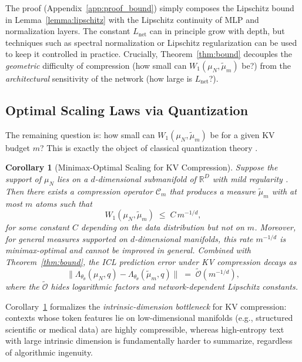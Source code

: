 \documentclass{article}
\theoremstyle{plain}
\newtheorem{corollary}[theorem]{Corollary}
\theoremstyle{definition}
\theoremstyle{remark}
\newcommand{\R}{\mathbb{R}}
\newcommand{\muN}{\mu_N} %
\newcommand{\tmu}{\tilde{\mu}} %
\newcommand{\Wass}[1]{W_{#1}} %
\newcommand{\LambdaOp}{\Lambda_{\theta}} %
\newcommand{\Compress}{\mathcal{C}_m} %
\begin{document}
The proof (Appendix~\ref{app:proof_bound}) simply composes the Lipschitz bound in Lemma~\ref{lemma:lipschitz} with the Lipschitz continuity of MLP and normalization layers.  
The constant $L_{\text{net}}$ can in principle grow with depth, but techniques such as spectral normalization or Lipschitz regularization  
\citep[e.g.,][]{chizat2018global,castin2024how} can be used to keep it controlled in practice.  
Crucially, Theorem~\ref{thm:bound} decouples the \emph{geometric} difficulty of compression (how small can $\Wass{1}(\muN,\tmu_m)$ be?)  
from the \emph{architectural} sensitivity of the network (how large is $L_{\text{net}}$?).

\subsection{Optimal Scaling Laws via Quantization}
\label{sec:theory_scaling}

The remaining question is: how small can $\Wass{1}(\muN,\tmu_m)$ be for a given KV budget $m$?  
This is exactly the object of classical quantization theory \citep{graf2000foundations,villani2009optimal}.

\begin{corollary}[Minimax-Optimal Scaling for KV Compression]
\label{cor:scaling}
Suppose the support of $\muN$ lies on a $d$-dimensional submanifold of $\R^D$ with mild regularity \citep{graf2000foundations}.  
Then there exists a compression operator $\Compress$ that produces a measure $\tmu_m$ with at most $m$ atoms such that
\begin{equation}
    \Wass{1}(\muN,\tmu_m)
    \;\le\;
    C \, m^{-1/d},
\end{equation}
for some constant $C$ depending on the data distribution but not on $m$.  
Moreover, for general measures supported on $d$-dimensional manifolds, this rate $m^{-1/d}$ is minimax-optimal and cannot be improved in general.  
Combined with Theorem~\ref{thm:bound}, the ICL prediction error under KV compression decays as
\begin{equation}
    \big\|
        \LambdaOp_\theta(\muN, q)
        -
        \LambdaOp_\theta(\tmu_m, q)
    \big\|
    \;=\;
    \tilde{\mathcal{O}}(m^{-1/d}),
\end{equation}
where the $\tilde{\mathcal{O}}$ hides logarithmic factors and network-dependent Lipschitz constants.
\end{corollary}

Corollary~\ref{cor:scaling} formalizes the \emph{intrinsic-dimension bottleneck} for KV compression:  
contexts whose token features lie on low-dimensional manifolds (e.g., structured scientific or medical data) are highly compressible,  
whereas high-entropy text with large intrinsic dimension is fundamentally harder to summarize, regardless of algorithmic ingenuity.
\end{document}
